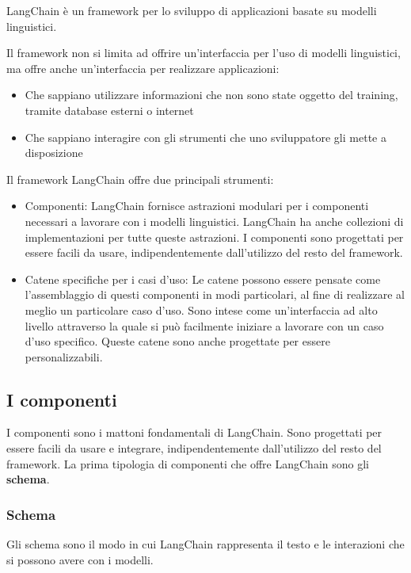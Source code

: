 LangChain è un framework per lo sviluppo di applicazioni basate su modelli linguistici.

Il framework non si limita ad offrire un'interfaccia per l'uso di modelli linguistici, ma offre anche un'interfaccia per realizzare applicazioni:

\begin{itemize}
    \item Che sappiano utilizzare informazioni che non sono state oggetto del training, tramite database esterni o internet
    \item Che sappiano interagire con gli strumenti che uno sviluppatore gli mette a disposizione
\end{itemize}

Il framework LangChain offre due principali strumenti:

\begin{itemize}
    \item Componenti: LangChain fornisce astrazioni modulari per i componenti necessari a lavorare con i modelli linguistici. LangChain ha anche collezioni di implementazioni per tutte queste astrazioni. I componenti sono progettati per essere facili da usare, indipendentemente dall'utilizzo del resto del framework.
    \item Catene specifiche per i casi d'uso: Le catene possono essere pensate come l'assemblaggio di questi componenti in modi particolari, al fine di realizzare al meglio un particolare caso d'uso. Sono intese come un'interfaccia ad alto livello attraverso la quale si può facilmente iniziare a lavorare con un caso d'uso specifico. Queste catene sono anche progettate per essere personalizzabili.
\end{itemize}

\subsection[I componenti]{I componenti}
I componenti sono i mattoni fondamentali di LangChain.
Sono progettati per essere facili da usare e integrare, indipendentemente dall'utilizzo del resto del framework.
La prima tipologia di componenti che offre LangChain sono gli \textbf{schema}.
\subsubsection*{Schema} Gli schema sono il modo in cui LangChain rappresenta il testo e le interazioni che si possono avere con i modelli.

